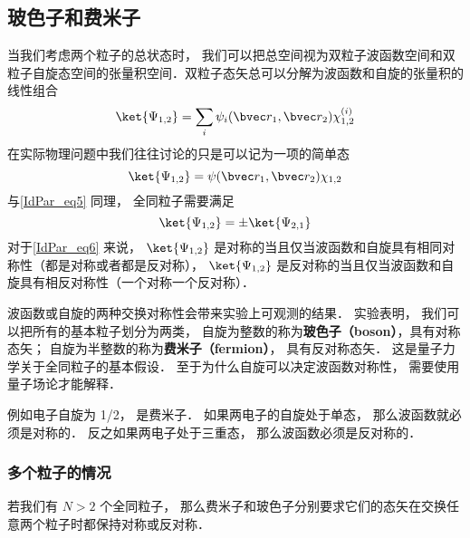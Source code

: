 \subsection{玻色子和费米子}
当我们考虑两个粒子的总状态时， 我们可以把总空间视为双粒子波函数空间和双粒子自旋态空间的张量积空间．双粒子态矢总可以分解为波函数和自旋的张量积的线性组合 %
\begin{equation}
\ket{\Psi_{1,2}} = \sum_i \psi_i(\bvec r_1, \bvec r_2) \chi^{(i)}_{1,2}
\end{equation}
在实际物理问题中我们往往讨论的只是可以记为一项的简单态
\begin{equation}\label{IdPar_eq6}
\ket{\Psi_{1,2}} = \psi(\bvec r_1, \bvec r_2) \chi_{1,2}
\end{equation}
与\autoref{IdPar_eq5} 同理， 全同粒子需要满足
\begin{equation}\label{IdPar_eq4}
\ket{\Psi_{1,2}} = \pm \ket{\Psi_{2,1}}
\end{equation}
对于\autoref{IdPar_eq6} 来说， $\ket{\Psi_{1,2}}$ 是对称的当且仅当波函数和自旋具有相同对称性（都是对称或者都是反对称）， $\ket{\Psi_{1,2}}$ 是反对称的当且仅当波函数和自旋具有相反对称性（一个对称一个反对称）．

波函数或自旋的两种交换对称性会带来实验上可观测的结果． 实验表明， 我们可以把所有的基本粒子划分为两类， 自旋为整数的称为\textbf{玻色子（boson）}，具有对称态矢； 自旋为半整数的称为\textbf{费米子（fermion）}， 具有反对称态矢． 这是量子力学关于全同粒子的基本假设． 至于为什么自旋可以决定波函数对称性， 需要使用量子场论才能解释． %

例如电子自旋为 1/2， 是费米子． 如果两电子的自旋处于单态， 那么波函数就必须是对称的． 反之如果两电子处于三重态， 那么波函数必须是反对称的．

\subsubsection{多个粒子的情况}
若我们有 $N > 2$ 个全同粒子， 那么费米子和玻色子分别要求它们的态矢在交换任意两个粒子时都保持对称或反对称．
